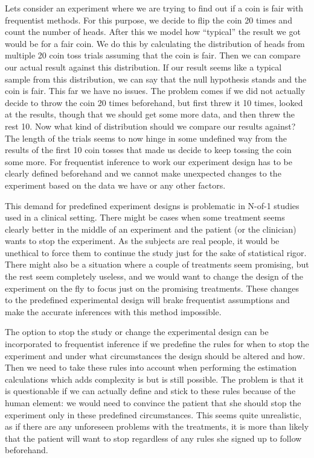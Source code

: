 \documentclass[12pt,a4paper,leqno]{report}
\theoremstyle{plain}
\theoremstyle{definition}
\theoremstyle{remark}
\begin{document}
Lets consider an experiment where we are trying to find out if a coin
is fair with frequentist methods. For this purpose, we decide to flip the coin 20 times
and count the number of heads. After this we model how ``typical'' the result we got
would be for a fair coin. We do this by calculating the distribution of heads from
multiple 20 coin toss trials
assuming that the coin is fair. Then we can compare our actual result against this
distribution. If our result seems like a typical sample from this distribution, we
can say that the null hypothesis stands and the coin is fair. This far we have no
issues. The problem comes if we did not actually decide to throw the coin 20 times
beforehand, but first threw it 10 times, looked at the results, though that we
should get some more data, and then threw the rest 10. Now what
kind of distribution should we compare our results against? The length of the trials
seems to now hinge in some undefined way from the results of the first 10 coin tosses
that made us decide to keep tossing the coin some more. For frequentist inference to
work our experiment design has to be clearly defined beforehand and we cannot make
unexpected changes to the experiment based on the data we have or any other factors.

This demand for predefined experiment designs is problematic in N-of-1 studies
used in a clinical setting. There might be cases when some treatment seems
clearly better in the middle of an experiment and the patient (or the clinician)
wants to stop the experiment. As the subjects are real people, it would be
unethical to force them to continue the study just for the sake of statistical
rigor. There might also be a situation where a couple of treatments seem
promising, but the rest seem completely useless, and we would want to change the
design of the experiment on the fly to focus just on the promising treatments.
These changes to the predefined experimental design will brake frequentist
assumptions and make the accurate inferences with this method impossible.

The option to stop the study or change the experimental design can be
incorporated to frequentist inference if we predefine the rules for when to
stop the experiment and under what circumstances the design should be altered
and how. Then we need to take these rules into account when performing the estimation
calculations which adds complexity is but is still possible. The problem is that it is
questionable if we can actually define and stick to these rules because of
the human element: we would need to convince the patient that she should
stop the experiment only in these predefined circumstances. This seems quite
unrealistic, as if there are any unforeseen problems with the treatments, it is
more than likely that the patient will want to stop regardless of any rules she
signed up to follow beforehand.
\end{document}

